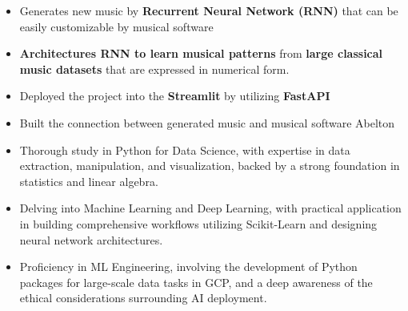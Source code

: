 \documentclass[10pt,a4paper,ragged2e,withhyper]{altacv}
\begin{document}
\medskip


\begin{itemize}
\item Generates new music by {\bf Recurrent Neural Network (RNN)} that can be easily customizable by musical software
\item {\bf Architectures RNN to learn musical patterns} from {\bf large classical music datasets} that are expressed in numerical form. 
\item Deployed the project into the {\bf Streamlit} by utilizing {\bf FastAPI}
\item Built the connection between generated music and musical software Abelton
\end{itemize}
\medskip



\begin{itemize}
\item Thorough study in Python for Data Science, with expertise in data extraction, manipulation, and visualization, backed by a strong foundation in statistics and linear algebra.
\item Delving into Machine Learning and Deep Learning, with practical application in building comprehensive workflows utilizing Scikit-Learn and designing neural network architectures.
\item Proficiency in ML Engineering, involving the development of Python packages for large-scale data tasks in GCP, and a deep awareness of the ethical considerations surrounding AI deployment.
\end{itemize}
\divider
\end{document}
